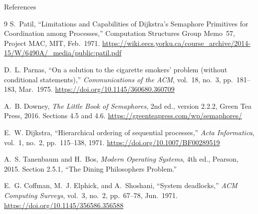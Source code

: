 \documentclass[aspectratio=169,10pt,xcolor=table]{beamer}
\begin{document}
\begin{frame}{References}
    \footnotesize
    \begin{thebibliography}{9}
        S.~Patil, ``Limitations and Capabilities of Dijkstra's Semaphore
        Primitives for Coordination among Processes,'' Computation Structures
        Group Memo~57, Project MAC, MIT, Feb.\ 1971.
        \url{https://wiki.eecs.yorku.ca/course_archive/2014-15/W/6490A/_media/public:patil.pdf}

        D.~L. Parnas, ``On a solution to the cigarette smokers' problem
        (without conditional statements),'' \emph{Communications of the ACM},
        vol.~18, no.~3, pp.~181--183, Mar.\ 1975.
        \url{https://doi.org/10.1145/360680.360709}

        A.~B. Downey, \emph{The Little Book of Semaphores}, 2nd ed., version
        2.2.2, Green Tea Press, 2016. Sections 4.5 and 4.6.
        \url{https://greenteapress.com/wp/semaphores/}

        E.~W. Dijkstra, ``Hierarchical ordering of sequential processes,''
        \emph{Acta Informatica}, vol.~1, no.~2, pp.~115--138, 1971.
        \url{https://doi.org/10.1007/BF00289519}

        A.~S. Tanenbaum and H.~Bos, \emph{Modern Operating Systems}, 4th ed.,
        Pearson, 2015. Section 2.5.1, ``The Dining Philosophers Problem.''

        E.~G. Coffman, M.~J. Elphick, and A.~Shoshani, ``System deadlocks,''
        \emph{ACM Computing Surveys}, vol.~3, no.~2, pp.~67--78, Jun.\ 1971.
        \url{https://doi.org/10.1145/356586.356588}
    \end{thebibliography}
\end{frame}
\end{document}
